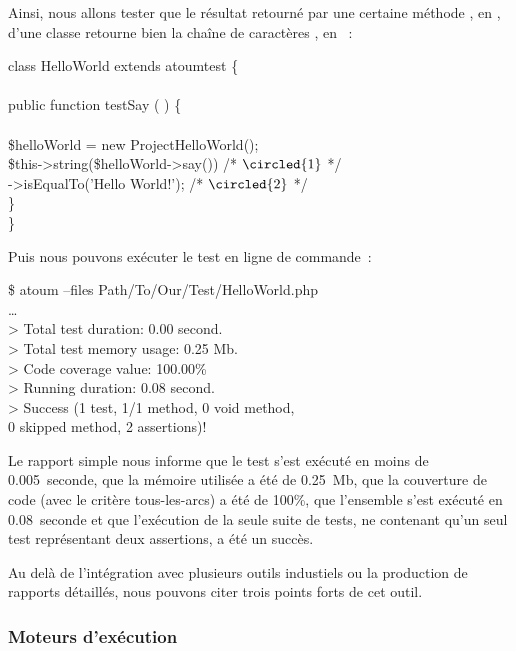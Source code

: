 \begin{example}

Ainsi, nous allons tester que le résultat retourné par une certaine méthode
, en , d'une classe 
retourne bien la chaîne de caractères , en ~:
%
\begin{pre}
class HelloWorld extends \bslash{}atoum\bslash{}test \{ \\
 \\
    public function testSay ( ) \{ \\
 \\
        \$helloWorld = new \bslash{}Project\bslash{}HelloWorld(); \\
        \$this->string(\$helloWorld->say())      /* \(\circled{1}\) */ \\
                  ->isEqualTo('Hello World!'); /* \(\circled{2}\) */ \\
    \} \\
\}
\end{pre}
%
Puis nous pouvons exécuter le test en ligne de commande~:
%
\begin{pre}
\$ atoum --files Path/To/Our/Test/HelloWorld.php \\
… \\
> Total test duration: 0.00 second. \\
> Total test memory usage: 0.25 Mb. \\
> Code coverage value: 100.00\% \\
> Running duration: 0.08 second. \\
> Success (1 test, 1/1 method, 0 void method, \\
           0 skipped method, 2 assertions)!
\end{pre}
%
Le rapport simple nous informe que le test s'est exécuté en moins de
0.005~seconde, que la mémoire utilisée a été de 0.25~Mb, que la couverture de
code (avec le critère tous-les-arcs) a été de 100\%, que l'ensemble s'est
exécuté en 0.08~seconde et que l'exécution de la seule suite de tests, ne
contenant qu'un seul test représentant deux assertions, a été un succès.

\end{example}

Au delà de l'intégration avec plusieurs outils industiels ou la production de
rapports détaillés, nous pouvons citer trois points forts de cet outil.

\subsubsection{Moteurs d'exécution}

